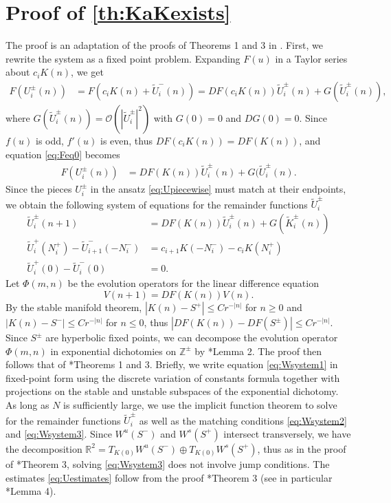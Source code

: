 \documentclass[12pt,reqno]{amsart}
\def\R{{\mathbb R}}
\def\Z{{\mathbb Z}}
\begin{document}
\appendix

\section{Proof of \texorpdfstring{\cref{th:KaKexists}}{Theorem 1}}\label{sec:proof1}

The proof is an adaptation of the proofs of Theorems 1 and 3 in \cite{Parker2020}. First, we rewrite the system as a fixed point problem. Expanding $F(u)$ in a Taylor series about $c_i K(n)$, we get
\begin{align}\label{eq:Feq0}
F(U_i^\pm(n)) &= F(c_i K(n) + \tilde{U}_i^-(n)) = 
D F(c_i K(n)) \tilde{U}_i^\pm(n) + G(\tilde{U}_i^\pm(n)),
\end{align}
where $G(\tilde{U}_i^\pm(n)) = \mathcal{O}(|\tilde{U}_i^\pm|^2)$ with $G(0) = 0$ and $DG(0) = 0$. Since $f(u)$ is odd, $f'(u)$ is even, thus $D F(c_i K(n)) = D F(K(n))$, and equation \cref{eq:Feq0} becomes
\begin{align}\label{eq:Feq1}
F(U_i^\pm(n)) &= 
D F(K(n)) \tilde{U}_i^\pm(n) + G(\tilde{U}_i^\pm(n).
\end{align}
Since the pieces $U_i^\pm$ in the ansatz \cref{eq:Upiecewise} must match at their endpoints, we obtain the following system of equations for the remainder functions $\tilde{U}_i^\pm$
\begin{align}
\tilde{U}_i^\pm(n+1) &= D F(K(n)) \tilde{U}_i^\pm(n) + G(\tilde{K}_i^\pm(n)) \label{eq:Wsystem1} \\
\tilde{U}_i^+(N_i^+) - \tilde{U}_{i+1}^-(-N_i^-) &= c_{i+1} K(-N_i^-) - c_i K(N_i^+) \label{eq:Wsystem2} \\
\tilde{U}_i^+(0) - \tilde{U}_i^-(0) &= 0.\label{eq:Wsystem3}
\end{align}
Let $\Phi(m, n)$ be the evolution operators for the linear difference equation 
\[
V(n+1) = D F(K(n)) V(n).
\]
By the stable manifold theorem, $|K(n) - S^+| \leq C r^{-|n|}$ for $n \geq 0$ and $|K(n) - S^-| \leq C r^{-|n|}$ for $n \leq 0$, thus $| DF(K(n)) - DF(S^\pm)| \leq C r^{-|n|}$. Since $S^\pm$ are hyperbolic fixed points, we can decompose the evolution operator $\Phi(m, n)$ in exponential dichotomies on $\Z^\pm$ by \cite{Parker2020}*{Lemma 2}. The proof then follows that of \cite{Parker2020}*{Theorems 1 and 3}. Briefly, we write equation \cref{eq:Wsystem1} in fixed-point form using the discrete variation of constants formula together with projections on the stable and unstable subspaces of the exponential dichotomy. As long as $N$ is sufficiently large, we use the implicit function theorem to solve for the remainder functions $\tilde{U}_i^\pm$ as well as the matching conditions \cref{eq:Wsystem2} and \cref{eq:Wsystem3}. Since $W^u(S^-)$ and $W^s(S^+)$ intersect transversely, we have the decomposition $\R^2 = T_{K(0)}W^u(S^-)\oplus T_{K(0)}W^s(S^+)$, thus as in the proof of \cite{Parker2020}*{Theorem 3}, solving \cref{eq:Wsystem3} does not involve jump conditions. The estimates \cref{eq:Uestimates} follow from the proof \cite{Parker2020}*{Theorem 3} (see in particular \cite{Parker2020}*{Lemma 4}).
\end{document}
